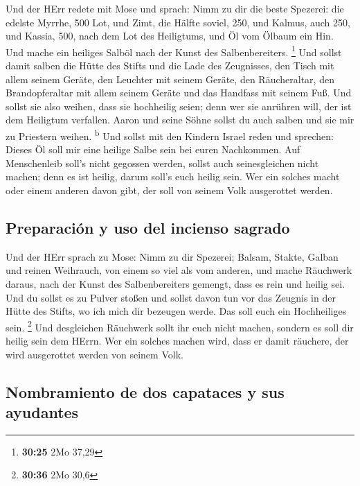  Und der HErr redete mit Mose und sprach: 
Nimm zu dir die beste Spezerei: die edelste Myrrhe, 500 Lot, und Zimt,
die Hälfte soviel, 250, und Kalmus, auch 250,  und
Kassia, 500, nach dem Lot des Heiligtums, und Öl vom Ölbaum ein Hin.
 Und mache ein heiliges Salböl nach der Kunst des
Salbenbereiters. \footnote{\textbf{30:25} 2Mo 37,29}  Und
sollst damit salben die Hütte des Stifts und die Lade des Zeugnisses,
 den Tisch mit allem seinem Geräte, den Leuchter mit
seinem Geräte, den Räucheraltar,  den Brandopferaltar mit
allem seinem Geräte und das Handfass mit seinem Fuß.  Und
sollst sie also weihen, dass sie hochheilig seien; denn wer sie anrühren
will, der ist dem Heiligtum verfallen.  Aaron und seine
Söhne sollst du auch salben und sie mir zu Priestern weihen.
\textsuperscript{b}  Und sollst mit den Kindern Israel
reden und sprechen: Dieses Öl soll mir eine heilige Salbe sein bei euren
Nachkommen.  Auf Menschenleib soll's nicht gegossen
werden, sollst auch seinesgleichen nicht machen; denn es ist heilig,
darum soll's euch heilig sein.  Wer ein solches macht
oder einem anderen davon gibt, der soll von seinem Volk ausgerottet
werden.

\hypertarget{preparaciuxf3n-y-uso-del-incienso-sagrado}{%
\subsection{Preparación y uso del incienso
sagrado}\label{preparaciuxf3n-y-uso-del-incienso-sagrado}}

 Und der HErr sprach zu Mose: Nimm zu dir Spezerei;
Balsam, Stakte, Galban und reinen Weihrauch, von einem so viel als vom
anderen,  und mache Räuchwerk daraus, nach der Kunst des
Salbenbereiters gemengt, dass es rein und heilig sei. 
Und du sollst es zu Pulver stoßen und sollst davon tun vor das Zeugnis
in der Hütte des Stifts, wo ich mich dir bezeugen werde. Das soll euch
ein Hochheiliges sein. \footnote{\textbf{30:36} 2Mo 30,6}
 Und desgleichen Räuchwerk sollt ihr euch nicht machen,
sondern es soll dir heilig sein dem HErrn.  Wer ein
solches machen wird, dass er damit räuchere, der wird ausgerottet werden
von seinem Volk.

\hypertarget{nombramiento-de-dos-capataces-y-sus-ayudantes}{%
\subsection{Nombramiento de dos capataces y sus
ayudantes}\label{nombramiento-de-dos-capataces-y-sus-ayudantes}}

